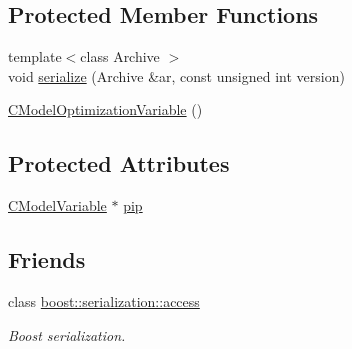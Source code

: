 \subsection*{Protected Member Functions}
\begin{DoxyCompactItemize}
\item 
{\footnotesize template$<$class Archive $>$ }\\void \hyperlink{class_go_s_u_m_1_1_c_model_optimization_variable_ac2e916e3523fec4487a8f567bb0a1af9}{serialize} (Archive \&ar, const unsigned int version)
\item 
\hyperlink{class_go_s_u_m_1_1_c_model_optimization_variable_a815f4d1d5b575f853e1248147bce755b}{C\-Model\-Optimization\-Variable} ()
\end{DoxyCompactItemize}
\subsection*{Protected Attributes}
\begin{DoxyCompactItemize}
\item 
\hyperlink{class_go_s_u_m_1_1_c_model_variable}{C\-Model\-Variable} $\ast$ \hyperlink{class_go_s_u_m_1_1_c_model_optimization_variable_ab1f22680bcb939d871b717126ea555f1}{pip}
\end{DoxyCompactItemize}
\subsection*{Friends}
\begin{DoxyCompactItemize}
\item 
class \hyperlink{class_go_s_u_m_1_1_c_model_optimization_variable_ac98d07dd8f7b70e16ccb9a01abf56b9c}{boost\-::serialization\-::access}
\begin{DoxyCompactList}\small\item\em Boost serialization. \end{DoxyCompactList}\end{DoxyCompactItemize}


